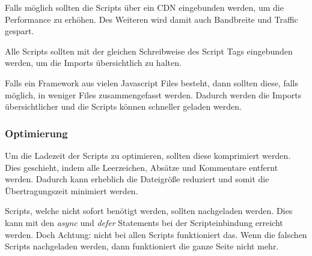 Falls möglich sollten die Scripts über ein CDN eingebunden werden, um die Performance zu erhöhen. Des Weiteren wird damit auch Bandbreite und Traffic gespart. 

Alle Scripts sollten mit der gleichen Schreibweise des Script Tags eingebunden werden, um die Imports übersichtlich zu halten. 

Falls ein Framework aus vielen Javascript Files besteht, dann sollten diese, falls möglich, in weniger Files zusammengefasst werden. Dadurch werden die Imports übersichtlicher und die Scripts können schneller geladen werden.

\subsubsection{Optimierung}
Um die Ladezeit der Scripts zu optimieren, sollten diese komprimiert werden. Dies geschieht, indem alle Leerzeichen, Absätze und Kommentare entfernt werden. Dadurch kann erheblich die Dateigröße reduziert und somit die Übertragungszeit minimiert werden. 

Scripts, welche nicht sofort benötigt werden, sollten nachgeladen werden. Dies kann mit den \textit{async} und \textit{defer} Statements bei der Scripteinbindung erreicht werden. Doch Achtung: nicht bei allen Scripts funktioniert das. Wenn die falschen Scripts nachgeladen werden, dann funktioniert die ganze Seite nicht mehr.